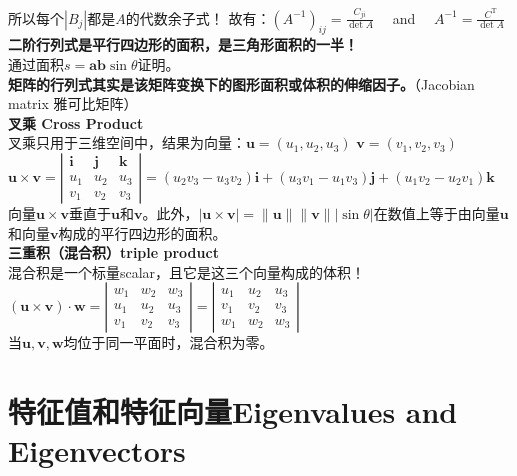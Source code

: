 \documentclass[UTF8]{article}
\begin{document}
    \\
    所以每个$|B_{j}|$都是$A$的代数余子式！ 故有：$\left(A^{-1}\right)_{i j}=\frac{C_{j i}}{\operatorname{det} A} \quad$ and $\quad A^{-1}=\frac{C^{\mathrm{T}}}{\operatorname{det} A}$
    \\
    \textbf{二阶行列式是平行四边形的面积，是三角形面积的一半！} \\
    通过面积$s=\bm{ab}\sin \theta$证明。
    \\
    \textbf{矩阵的行列式其实是该矩阵变换下的图形面积或体积的伸缩因子。}（Jacobian matrix 雅可比矩阵） \\
    \textbf{叉乘 Cross Product}\\
    叉乘只用于三维空间中，结果为向量：$\bm{u}=\left(u_{1}, u_{2}, u_{3}\right)$ $\bm{v}=\left(v_{1}, v_{2}, v_{3}\right)$
    \\
    $\bm{u} \times \bm{v}=\left|\begin{array}{ccc}\bm{i} & \bm{j} & \bm{k} \\ {u_{1}} & {u_{2}} & {u_{3}} \\ {v_{1}} & {v_{2}} & {v_{3}}\end{array}\right|=\left(u_{2} v_{3}-u_{3} v_{2}\right) \bm{i}+\left(u_{3} v_{1}-u_{1} v_{3}\right) \bm{j}+\left(u_{1} v_{2}-u_{2} v_{1}\right) \bm{k}$
    \\
    向量$\bm{u} \times \bm{v}$垂直于$\bm{u}$和$\bm{v}$。此外，$|\bm{u} \times \bm{v}|=\|\boldsymbol{u}\|\|\boldsymbol{v}\||\sin \theta|$在数值上等于由向量$\bm{u}$和向量$\bm{v}$构成的平行四边形的面积。
    \\
    \textbf{三重积（混合积）triple product} \\
    混合积是一个标量scalar，且它是这三个向量构成的体积！\\
    $(\boldsymbol{u} \times \boldsymbol{v}) \cdot \boldsymbol{w}=\left|\begin{array}{lll}{w_{1}} & {w_{2}} & {w_{3}} \\ {u_{1}} & {u_{2}} & {u_{3}} \\ {v_{1}} & {v_{2}} & {v_{3}}\end{array}\right|=\left|\begin{array}{ccc}{u_{1}} & {u_{2}} & {u_{3}} \\ {v_{1}} & {v_{2}} & {v_{3}} \\ {w_{1}} & {w_{2}} & {w_{3}}\end{array}\right|$
    \\
    当$\bm{u,v,w}$均位于同一平面时，混合积为零。

    \section{特征值和特征向量Eigenvalues and Eigenvectors}
\end{document}
